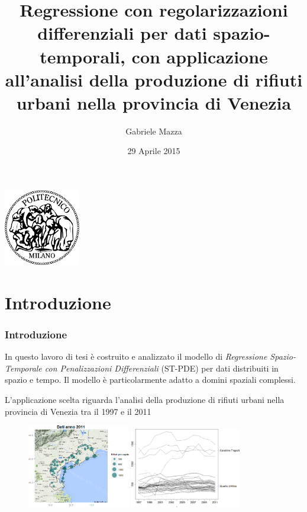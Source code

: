 \documentclass[landscape,9pt]{beamer}                           %
\date{29 Aprile 2015}
\author{Gabriele Mazza}
\title{Regressione con regolarizzazioni differenziali per dati spazio-temporali, con applicazione all'analisi della produzione di rifiuti urbani nella provincia di Venezia}
\begin{document}
\begin{frame}[noframenumbering]
\maketitle
\begin{center}
\includegraphics[width=0.25\textwidth,
	height=0.28\textheight]
	{Immagini/Logo.png}
\end{center}
\end{frame}

\section{Introduzione}
\begin{frame}
\frametitle{Introduzione}
In questo lavoro di tesi è costruito e analizzato il modello di \textit{Regressione Spazio-Temporale con Penalizzazioni Differenziali} (ST-PDE) per dati distribuiti in spazio e tempo. Il modello è particolarmente adatto a domini spaziali complessi.
\par\bigskip

{
L'applicazione scelta riguarda l'analisi della produzione di rifiuti urbani nella provincia di Venezia tra il 1997 e il 2011
\begin{figure}[h]
	\centering
		\subfigure
   		{
		\includegraphics[width=0.40\textwidth]{Immagini/CTQDA.png}   
   		}
	\subfigure
   		{
		\includegraphics[width=0.43\textwidth]{Immagini/andamenti_temporali.png}
   		}
\end{figure}
}
\end{frame}
\end{document}

